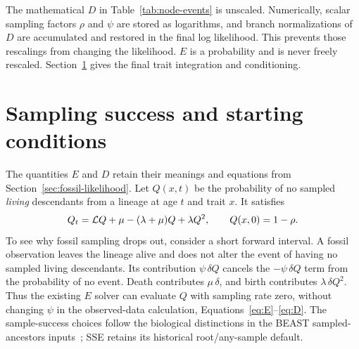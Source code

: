 \documentclass[11pt]{article}
\begin{document}
The mathematical $D$ in Table~\ref{tab:node-events} is unscaled. Numerically, scalar sampling
factors $\rho$ and $\psi$ are stored as logarithms, and branch normalizations of $D$ are
accumulated and restored in the final log likelihood. This prevents those rescalings from
changing the likelihood. $E$ is a probability and is never freely rescaled.
Section~\ref{sec:conditioning} gives the final trait integration and conditioning.

\section{Sampling success and starting conditions}\label{sec:conditioning}
The quantities $E$ and $D$ retain their meanings and equations from
Section~\ref{sec:fossil-likelihood}. Let $Q(x,t)$ be the probability of no sampled
\emph{living} descendants from a lineage at age $t$ and trait $x$. It satisfies
\begin{equation}\label{eq:Q}
 Q_t=\mathcal{L} Q+\mu-(\lambda+\mu)Q+\lambda Q^2,\qquad Q(x,0)=1-\rho.
\end{equation}
To see why fossil sampling drops out, consider a short forward interval. A fossil observation
leaves the lineage alive and does not alter the event of having no sampled living descendants.
Its contribution $\psi\,\delta Q$ cancels the $-\psi\,\delta Q$ term from the probability of
no event. Death contributes $\mu\,\delta$, and birth contributes $\lambda\,\delta Q^2$.
Thus the existing $E$ solver can evaluate $Q$ with sampling rate zero, without changing
$\psi$ in the observed-data calculation, Equations~\eqref{eq:E}--\eqref{eq:D}.
The sample-success choices follow the biological distinctions in the BEAST sampled-ancestors
inputs~\cite{saInputs}; SSE retains its historical root/any-sample default.
\end{document}
